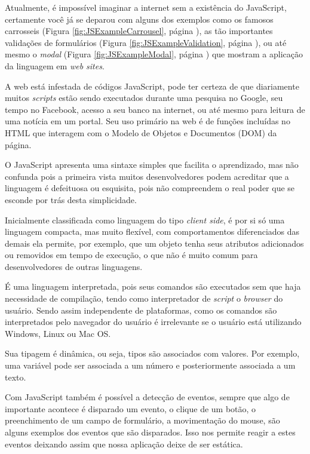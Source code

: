 \documentclass[
	12pt,				%
	openright,			%
	twoside,			%
	a4paper,			%
	english,			%
	brazil				%
	]{abntex2}
\begin{document}
Atualmente, é impossível imaginar a internet sem a existência do JavaScript, certamente você já se deparou com alguns dos exemplos como os famosos carrosseis (Figura \ref{fig:JSExampleCarrousel}, página \pageref{fig:JSExampleCarrousel}), as tão importantes validações de formulários (Figura \ref{fig:JSExampleValidation}, página \pageref{fig:JSExampleValidation}), ou até mesmo o \textit{modal} (Figura \ref{fig:JSExampleModal}, página \pageref{fig:JSExampleModal}) que mostram a aplicação da linguagem em \textit{web sites}.

A web está infestada de códigos JavaScript, pode ter certeza de que diariamente muitos \textit{scripts} estão sendo executados durante uma pesquisa no Google, seu tempo no Facebook, acesso a seu banco na internet, ou até mesmo para leitura de uma notícia em um portal. Seu uso primário na web é de funções incluídas no HTML que interagem com o Modelo de Objetos e Documentos (DOM) da página.

O JavaScript apresenta uma sintaxe simples que facilita o aprendizado, mas não confunda pois a primeira vista muitos desenvolvedores podem acreditar que a linguagem é defeituosa ou esquisita, pois não compreendem o real poder que se esconde por trás desta simplicidade. 

Inicialmente classificada como linguagem do tipo \textit{client side}, é por si só uma linguagem compacta, mas muito flexível, com comportamentos diferenciados das demais ela permite, por exemplo, que um objeto tenha seus atributos adicionados ou removidos em tempo de execução, o que não é muito comum para desenvolvedores de outras linguagens.

É uma linguagem interpretada, pois seus comandos são executados sem que haja necessidade de compilação, tendo como interpretador de \textit{script} o \textit{browser} do usuário. Sendo assim independente de plataformas, como os comandos são interpretados pelo navegador do usuário é irrelevante se o usuário está utilizando Windows, Linux ou Mac OS.

Sua tipagem é dinâmica, ou seja, tipos são associados com valores. Por exemplo, uma variável pode ser associada a um número e posteriormente associada a um texto.

Com JavaScript também é possível a detecção de eventos, sempre que algo de importante acontece é disparado um evento, o clique de um botão, o preenchimento de um campo de formulário, a movimentação do mouse, são alguns exemplos dos eventos que são disparados. Isso nos permite reagir a estes eventos deixando assim que nossa aplicação deixe de ser estática.
\end{document}
